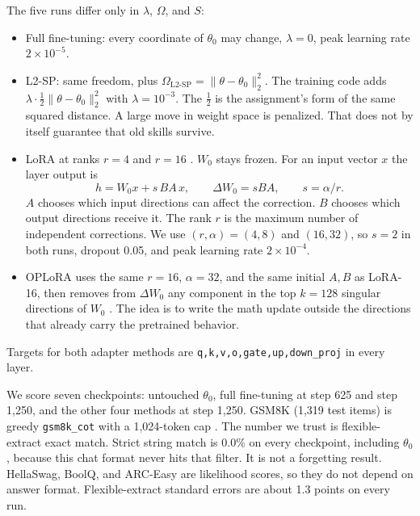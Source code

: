 \documentclass[10pt]{article}
\begin{document}
The five runs differ only in $\lambda$, $\Omega$, and $S$:
\begin{itemize}
\item Full fine-tuning: every coordinate of $\theta_0$ may change, $\lambda=0$, peak learning rate $2\times10^{-5}$.
\item L2-SP: same freedom, plus $\Omega_{\mathrm{L2\mbox{-}SP}}=\lVert\theta-\theta_0\rVert_2^2$.
The training code adds $\lambda\cdot\tfrac12\lVert\theta-\theta_0\rVert_2^2$ with $\lambda=10^{-3}$.
The $\tfrac12$ is the assignment's form of the same squared distance.
A large move in weight space is penalized.
That does not by itself guarantee that old skills survive.
\item LoRA at ranks $r=4$ and $r=16$ \cite{hu2022lora}.
$W_0$ stays frozen.
For an input vector $x$ the layer output is
\begin{equation}
h=W_0 x+s\,BA\,x,
\qquad
\Delta W_0=sBA,
\qquad
s=\alpha/r.
\label{eq:lora}
\end{equation}
$A$ chooses which input directions can affect the correction.
$B$ chooses which output directions receive it.
The rank $r$ is the maximum number of independent corrections.
We use $(r,\alpha)=(4,8)$ and $(16,32)$, so $s=2$ in both runs, dropout 0.05, and peak learning rate $2\times10^{-4}$.
\item OPLoRA uses the same $r=16$, $\alpha=32$, and the same initial $A,B$ as LoRA-16, then removes from $\Delta W_0$ any component in the top $k=128$ singular directions of $W_0$ \cite{xiong2026oplora}.
The idea is to write the math update outside the directions that already carry the pretrained behavior.
\end{itemize}
Targets for both adapter methods are \texttt{q,k,v,o,gate,up,down\_proj} in every layer.

We score seven checkpoints: untouched $\theta_0$, full fine-tuning at step 625 and step 1{,}250, and the other four methods at step 1{,}250.
GSM8K (1{,}319 test items) is greedy \texttt{gsm8k\_cot} with a 1{,}024-token cap \cite{cobbe2021gsm8k,gao2024lmeval}.
The number we trust is flexible-extract exact match.
Strict string match is 0.0\% on every checkpoint, including $\theta_0$, because this chat format never hits that filter.
It is not a forgetting result.
HellaSwag, BoolQ, and ARC-Easy are likelihood scores, so they do not depend on answer format.
Flexible-extract standard errors are about 1.3 points on every run.
\end{document}
